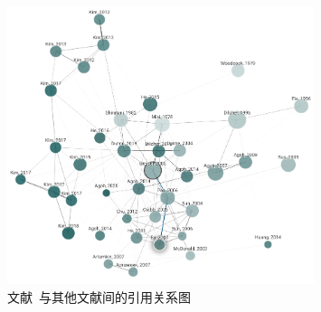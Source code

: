\documentclass{booki}
\begin{document}
\begin{figure}[H]
    \centering
    \includegraphics[width=0.8\textwidth]{figure/graph.png}
    \caption{文献~\cite{GesselMiki2005}与其他文献间的引用关系图}
    \label{fig:mikiGrapg}
\end{figure}
\end{document}
